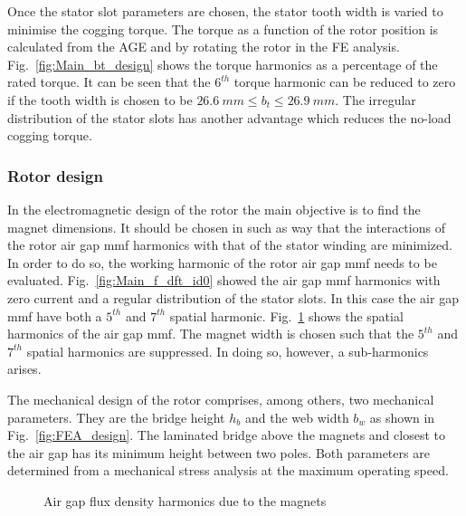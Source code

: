 Once the stator slot parameters are chosen, the stator tooth width is varied to minimise the cogging torque. The torque as a function of the rotor position is calculated from the AGE and by rotating the rotor in the FE analysis. Fig.~\ref{fig:Main_bt_design} shows the torque harmonics as a percentage of the rated torque. It can be seen that the $6^{th}$ torque harmonic can be reduced to zero if the tooth width is chosen to be $\SI{26.6}{mm} \leq b_t \leq \SI{26.9}{mm}$. The irregular distribution of the stator slots has another advantage which reduces the no-load cogging torque.

\subsubsection{Rotor design}
In the electromagnetic design of the rotor the main objective is to find the magnet dimensions. It should be chosen in such as way that the interactions of the rotor air gap mmf harmonics with that of the stator winding are minimized. In order to do so, the working harmonic of the rotor air gap mmf needs to be evaluated. Fig.~\ref{fig:Main_f_dft_id0} showed the air gap mmf harmonics with zero current and a regular distribution of the stator slots. In this case the air gap mmf have both a $5^{th}$ and $7^{th}$ spatial harmonic. Fig.~\ref{fig:mag_entwurf} shows the spatial harmonics of the air gap mmf. The magnet width is chosen such that the $5^{th}$ and $7^{th}$ spatial harmonics are suppressed. In doing so, however, a sub-harmonics arises.

The mechanical design of the rotor comprises, among others, two mechanical parameters. They are the bridge height $h_b$ and the web width $b_w$ as shown in Fig.~\ref{fig:FEA_design}. The laminated bridge above the magnets and closest to the air gap has its minimum height between two poles. Both parameters are determined from a mechanical stress analysis at the maximum operating speed.      

\begin{figure}[htbp]
  \centering
    
  \caption{Air gap flux density harmonics due to the magnets}
  \label{fig:mag_entwurf}
\end{figure}

